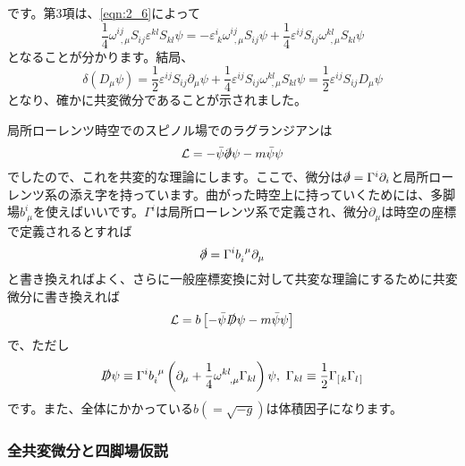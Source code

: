 \documentclass[unicode,a4paper,11pt]{ltjsarticle}
\begin{document}
です。第3項は、\eqref{eqn:2_6}によって
\begin{equation}
   \frac{1}{4}\omega^{ij}_{\ \ ,\mu}S_{ij}\varepsilon^{kl}S_{kl}\psi
   =
   -
   \varepsilon^{i}_{\ k}\omega^{ij}_{\ \ ,\mu}
   S_{ij}\psi
   +
   \frac{1}{4}\varepsilon^{ij}S_{ij}\omega^{kl}_{\ \ ,\mu}S_{kl}\psi
   \label{eqn:2_7}
\end{equation}
となることが分かります。結局、
\begin{equation}
   \delta(D_{\mu}\psi)
   =
   \frac{1}{2}\varepsilon^{ij}S_{ij}\partial_{\mu}\psi
   +
   \frac{1}{4}\varepsilon^{ij}S_{ij}\omega^{kl}_{\ \ ,\mu}S_{kl}\psi
   =
   \frac{1}{2}\varepsilon^{ij}S_{ij}D_{\mu}\psi
\end{equation}
となり、確かに共変微分であることが示されました。

局所ローレンツ時空でのスピノル場でのラグランジアンは
\begin{equation}
   \mathcal{L}
   =
   -
   \bar{\psi}\slashed{\partial}\psi
   -
   m\bar{\psi}\psi
\end{equation}
でしたので、これを共変的な理論にします。ここで、微分は$\slashed
   {\partial}=\Gamma^{i}\partial_{i}$と局所ローレンツ系の添え字を持っています。曲がった時空上に持っていくためには、多脚場$b^{i}_{\ \mu}$を使えばいいです。$\Gamma^{i}$は局所ローレンツ系で定義され、微分$\partial_{\mu}$は時空の座標で定義されるとすれば
\begin{equation}
   \slashed{\partial}
   =
   \Gamma^{i}b^{\ \mu}_{i}\partial_{\mu}
\end{equation}
と書き換えればよく、さらに一般座標変換に対して共変な理論にするために共変微分に書き換えれば
\begin{equation}
   \mathcal{L}
   =
   b
   \left[
      -\bar{\psi}\slashed{D}\psi
      -m\bar{\psi}\psi
      \right]
\end{equation}
で、ただし
\begin{equation}
   \slashed{D}\psi
   \equiv
   \Gamma^{i}b^{\ \mu}_{i}
   \left(
   \partial_{\mu}+\frac{1}{4}\omega^{kl}_{\ \ ,\mu}\Gamma_{kl}
   \right)
   \psi
   ,\
   \Gamma_{kl}
   \equiv
   \frac{1}{2}\Gamma_{\left[\right.k}\Gamma_{l\left.\right]}
\end{equation}
です。また、全体にかかっている$b(=\sqrt{-g})$は体積因子になります。


\subsubsection*{全共変微分と四脚場仮説}
\end{document}
